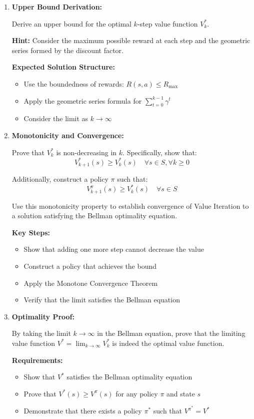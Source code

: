 \documentclass[12pt]{article}
\begin{document}
\begin{enumerate}
    \item \textbf{Upper Bound Derivation:}
    
    Derive an upper bound for the optimal \( k \)-step value function \( V_k^* \).

    \textbf{Hint:} Consider the maximum possible reward at each step and the geometric series formed by the discount factor.
    
    \textbf{Expected Solution Structure:}
    \begin{itemize}
        \item Use the boundedness of rewards: \( R(s,a) \leq R_{\text{max}} \)
        \item Apply the geometric series formula for \( \sum_{t=0}^{k-1} \gamma^t \)
        \item Consider the limit as \( k \rightarrow \infty \)
    \end{itemize}

    \item \textbf{Monotonicity and Convergence:}
    
    Prove that \( V_k^* \) is non-decreasing in \( k \). Specifically, show that:
    \[
    V_{k+1}^*(s) \geq V_k^*(s) \quad \forall s \in S, \forall k \geq 0
    \]
    
    Additionally, construct a policy \( \pi \) such that:
    \[
    V_{k+1}^\pi(s) \geq V_k^*(s) \quad \forall s \in S
    \]
    
    Use this monotonicity property to establish convergence of Value Iteration to a solution satisfying the Bellman optimality equation.
    
    \textbf{Key Steps:}
    \begin{itemize}
        \item Show that adding one more step cannot decrease the value
        \item Construct a policy that achieves the bound
        \item Apply the Monotone Convergence Theorem
        \item Verify that the limit satisfies the Bellman equation
    \end{itemize}

    \item \textbf{Optimality Proof:}
    
    By taking the limit \( k \rightarrow \infty \) in the Bellman equation, prove that the limiting value function \( V^* = \lim_{k \rightarrow \infty} V_k^* \) is indeed the optimal value function.
    
    \textbf{Requirements:}
    \begin{itemize}
        \item Show that \( V^* \) satisfies the Bellman optimality equation
        \item Prove that \( V^*(s) \geq V^\pi(s) \) for any policy \( \pi \) and state \( s \)
        \item Demonstrate that there exists a policy \( \pi^* \) such that \( V^{\pi^*} = V^* \)
    \end{itemize}
 \end{enumerate}
\end{document}
